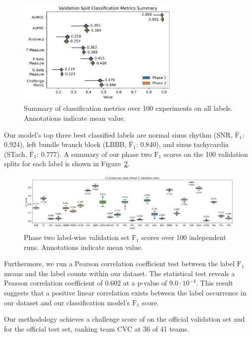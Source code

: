 \documentclass[twocolumn]{cinc}
\begin{document}
\begin{figure}[hb]
  \centering
  \includegraphics[width=7.9cm]{fig/classification_metrics_phase_1_2.png}
  \caption{Summary of classification metrics over 100 experiments on all labels. Annotations indicate mean value.}
  \label{fig:classification_metrics_summary}
\end{figure}

Our model's top three best classified labels are normal sinus rhythm (SNR, $\bar{\text{F}}_1$: 0.924), left bundle branch block (LBBB, $\bar{\text{F}}_1$: 0.840), and sinus tachycardia (STach, $\bar{\text{F}}_1$: 0.777).
A summary of our phase two $\text{F}_1$ scores on the 100 validation splits for each label is shown in Figure~\ref{fig:f1_score}.

\begin{figure}[ht]
  \centering
  \includegraphics[width=17.0cm]{fig/label_f1s.png}
  \caption{Phase two label-wise validation set $\text{F}_1$ scores over 100 independent runs. Annotations indicate mean value.}
  \label{fig:f1_score}
\end{figure}

Furthermore, we run a Pearson correlation coefficient test between the label $\text{F}_1$ means and the label counts within our dataset.
The statistical test reveals a Pearson correlation coefficient of 0.602 at a p-value of $9.0 \cdot 10^{-4}$.
This result suggests that a positive linear correlation exists between the label occurrence in our dataset and our classification model's $\text{F}_1$ score.

Our methodology achieves a challenge score of \officialvalscore on the official validation set and \officialtestscore for the official test set, ranking team CVC at 36 of 41 teams.
\end{document}
